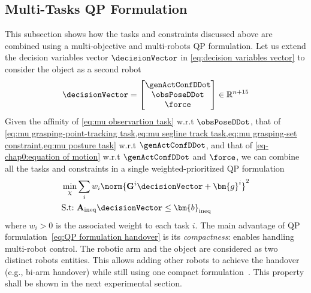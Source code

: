	\subsection{Multi-Tasks QP Formulation}
	This subsection shows how the tasks and constraints discussed above are combined using a multi-objective and multi-robots QP formulation. 
	Let us extend the decision variables vector $\decisionVector$ in \cref{eq:decision variables vector} to consider the object as a second robot
	\begin{equation}
		\decisionVector=\begin{bmatrix}
			\genActConfDDot \\ \obsPoseDDot \\ \force
		\end{bmatrix}\in\mathbb{R}^{n+15}
	\end{equation} 
	Given the affinity of \cref{eq:mu observartion task} w.r.t $\obsPoseDDot$,  that of \cref{eq:mu grasping-point-tracking task,eq:mu segline track task,eq:mu grasping-set constraint,eq:mu posture task} w.r.t $\genActConfDDot$, and that of \cref{eq-chap0:equation of motion} w.r.t $\genActConfDDot$ and $\force$,  we can combine all the tasks and constraints in a single weighted-prioritized QP formulation 
	\begin{subequations}\label{eq:QP formulation handover}
		\begin{align}
			\label{eq:QP cost-function}\underset{\chi}{\min} &\sum_{i}w_i\norm{\mathbf{G}^i\decisionVector+ \bm{g}^i}^2 \\
			\label{eq:QP constraint}\text{S.t:~} &\mathbf{A}_{\rm ineq}\decisionVector\leq \bm{b}_{\rm ineq}
		\end{align}
	\end{subequations}
	where $w_i>0$ is the associated weight to each task $i$.
	The main advantage of QP formulation~\eqref{eq:QP formulation handover} is its \emph{compactness}: enables handling multi-robot control. The robotic arm and the object are considered as two distinct robots entities. This allows adding other robots to achieve the handover (e.g., bi-arm handover) while still using one compact formulation~\cite{bouyarmane2019tro}. This property shall be shown in the next experimental section.
